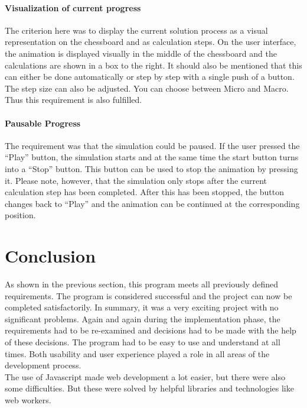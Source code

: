 \paragraph{Visualization of current progress}
The criterion here was to display the current solution process as a visual representation on the chessboard and as calculation steps. On the user interface, the animation is displayed visually in the middle of the chessboard and the calculations are shown in a box to the right. It should also be mentioned that this can either be done automatically or step by step with a single push of a button. The step size can also be adjusted. You can choose between Micro and Macro. Thus this requirement is also fulfilled.
\paragraph{Pausable Progress}
The requirement was that the simulation could be paused. If the user pressed the \enquote{Play} button, the simulation starts and at the same time the start button turns into a \enquote{Stop} button. This button can be used to stop the animation by pressing it. Please note, however, that the simulation only stops after the current calculation step has been completed. After this has been stopped, the button changes back to \enquote{Play} and the animation can be continued at the corresponding position.
\section{Conclusion}
As shown in the previous section, this program meets all previously defined requirements. The program is considered successful and the project can now be completed satisfactorily. In summary, it was a very exciting project with no significant problems. Again and again during the implementation phase, the requirements had to be re-examined and decisions had to be made with the help of these decisions. The program had to be easy to use and understand at all times. Both usability and user experience played a role in all areas of the development process. 
\\
The use of Javascript made web development a lot easier, but there were also some difficulties. But these were solved by helpful libraries and technologies like web workers. 
